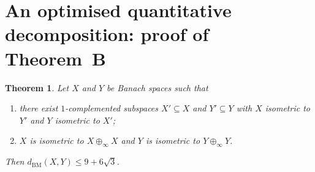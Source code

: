 \documentclass[11pt]{amsart}
\renewcommand{\le}{\leqslant}
\newtheorem{theorem}{Theorem}[section]
\theoremstyle{definition}
\theoremstyle{remark}
\theoremstyle{plain}
\numberwithin{equation}{section}
\newcommand{\BM}{\mathrm{BM}}
\newcommand{\dist}{d_{\BM}}
\begin{document}
\section{An optimised quantitative decomposition: proof of Theorem~B}%
\label{sec:optimised}

\begin{theorem}\label{thm:optimised}
Let $X$ and $Y$ be Banach spaces such that
\begin{enumerate}[label=\textup{(\roman*)}]
\item there exist $1$-complemented subspaces $X'\subseteq X$ and
$Y'\subseteq Y$ with $X$ isometric to $Y'$ and $Y$ isometric to $X'$;
\item $X$ is isometric to $X\oplus_\infty X$ and $Y$ is isometric
to $Y\oplus_\infty Y$.
\end{enumerate}
Then $\dist(X,Y)\le 9+6\sqrt{3}$.
\end{theorem}
\end{document}
